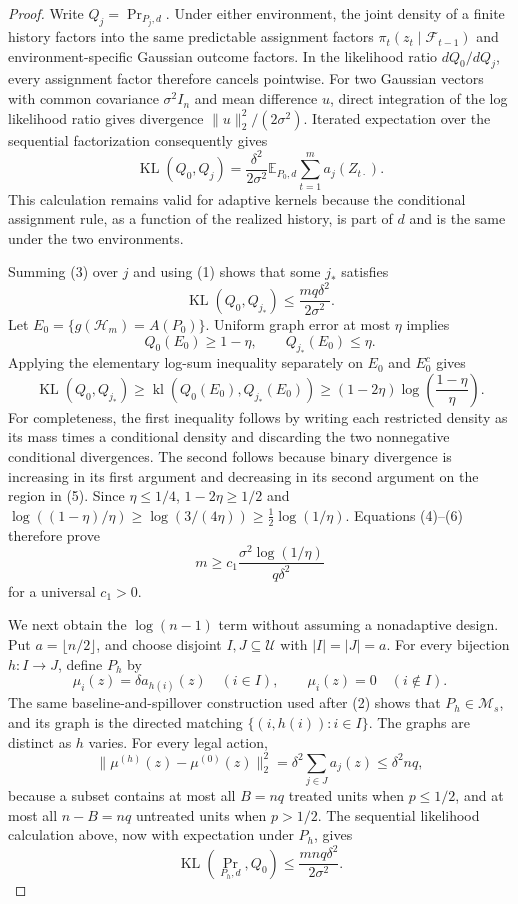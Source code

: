 \documentclass{article}
\begin{document}
\begin{proof}
Write \(Q_j=\Pr_{P_j,d}\).  Under either environment, the joint density of a finite history factors into the same predictable assignment factors \(\pi_t(z_t\mid\mathcal F_{t-1})\) and environment-specific Gaussian outcome factors.  In the likelihood ratio \(dQ_0/dQ_j\), every assignment factor therefore cancels pointwise.  For two Gaussian vectors with common covariance \(\sigma^2I_n\) and mean difference \(u\), direct integration of the log likelihood ratio gives divergence \(\lVert u\rVert_2^2/(2\sigma^2)\).  Iterated expectation over the sequential factorization consequently gives
\[
 \operatorname{KL}(Q_0,Q_j)
 =\frac{\delta^2}{2\sigma^2}
   \mathbb E_{P_0,d}\sum_{t=1}^m a_j(Z_{t\cdot}). \tag{3}
\]
This calculation remains valid for adaptive kernels because the conditional assignment rule, as a function of the realized history, is part of \(d\) and is the same under the two environments.

Summing (3) over \(j\) and using (1) shows that some \(j_*\) satisfies
\[
 \operatorname{KL}(Q_0,Q_{j_*})\le \frac{mq\delta^2}{2\sigma^2}. \tag{4}
\]
Let \(E_0=\{g(\mathscr H_m)=A(P_0)\}\).  Uniform graph error at most \(\eta\) implies
\[
 Q_0(E_0)\ge1-\eta,
 \qquad Q_{j_*}(E_0)\le\eta. \tag{5}
\]
Applying the elementary log-sum inequality separately on \(E_0\) and \(E_0^c\) gives
\[
 \operatorname{KL}(Q_0,Q_{j_*})
 \ge \operatorname{kl}(Q_0(E_0),Q_{j_*}(E_0))
 \ge (1-2\eta)\log\!\left(\frac{1-\eta}{\eta}\right). \tag{6}
\]
For completeness, the first inequality follows by writing each restricted density as its mass times a conditional density and discarding the two nonnegative conditional divergences.  The second follows because binary divergence is increasing in its first argument and decreasing in its second argument on the region in (5).  Since \(\eta\le1/4\), \(1-2\eta\ge1/2\) and
\(\log((1-\eta)/\eta)\ge\log(3/(4\eta))\ge\frac12\log(1/\eta)\).  Equations (4)--(6) therefore prove
\[
 m\ge c_1\frac{\sigma^2\log(1/\eta)}{q\delta^2} \tag{7}
\]
for a universal \(c_1>0\).

We next obtain the \(\log(n-1)\) term without assuming a nonadaptive design.  Put \(a=\lfloor n/2\rfloor\), and choose disjoint \(I,J\subseteq\mathcal U\) with \(|I|=|J|=a\).  For every bijection \(h:I\to J\), define \(P_h\) by
\[
 \mu_i(z)=\delta a_{h(i)}(z)\quad(i\in I),
 \qquad \mu_i(z)=0\quad(i\notin I). \tag{8}
\]
The same baseline-and-spillover construction used after (2) shows that \(P_h\in\mathcal M_s\), and its graph is the directed matching \(\{(i,h(i)):i\in I\}\).  The graphs are distinct as \(h\) varies.  For every legal action,
\[
 \lVert\mu^{(h)}(z)-\mu^{(0)}(z)\rVert_2^2
 =\delta^2\sum_{j\in J}a_j(z)
 \le \delta^2nq, \tag{9}
\]
because a subset contains at most all \(B=nq\) treated units when \(p\le1/2\), and at most all \(n-B=nq\) untreated units when \(p>1/2\).  The sequential likelihood calculation above, now with expectation under \(P_h\), gives
\[
 \operatorname{KL}(\Pr_{P_h,d},Q_0)
 \le\frac{mnq\delta^2}{2\sigma^2}. \tag{10}
\]


\end{proof}
\end{document}
